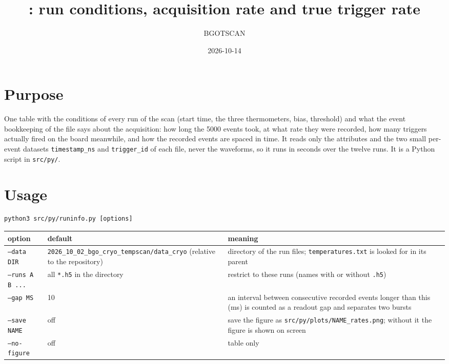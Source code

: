 \documentclass[11pt]{article}
\title{\code{runinfo.py}: run conditions, acquisition rate and true trigger rate}
\author{BGOTSCAN}
\date{2026-10-14}
\newcommand{\code}[1]{\texttt{#1}}
\begin{document}
\maketitle

\section{Purpose}

One table with the conditions of every run of the scan (start time, the
three thermometers, bias, threshold) and what the event bookkeeping of the
file says about the acquisition: how long the 5000 events took, at what rate
they were recorded, how many triggers actually fired on the board meanwhile,
and how the recorded events are spaced in time. It reads only the attributes
and the two small per-event datasets \code{timestamp\_ns} and
\code{trigger\_id} of each file, never the waveforms, so it runs in seconds
over the twelve runs. It is a Python script in \code{src/py/}.

\section{Usage}

\begin{lstlisting}
python3 src/py/runinfo.py [options]
\end{lstlisting}

\begin{center}
\begin{tabular}{l l p{78mm}}
\toprule
option & default & meaning \\
\midrule
\code{--data DIR} & \code{2026\_10\_02\_bgo\_cryo\_tempscan/data\_cryo} (relative to the repository) & directory of the run files; \code{temperatures.txt} is looked for in its parent \\
\code{--runs A B ...} & all \code{*.h5} in the directory & restrict to these runs (names with or without \code{.h5}) \\
\code{--gap MS} & 10 & an interval between consecutive recorded events longer than this (ms) is counted as a readout gap and separates two bursts \\
\code{--save NAME} & off & save the figure as \code{src/py/plots/NAME\_rates.png}; without it the figure is shown on screen \\
\code{--no-figure} & off & table only \\
\bottomrule
\end{tabular}
\end{center}
\end{document}
